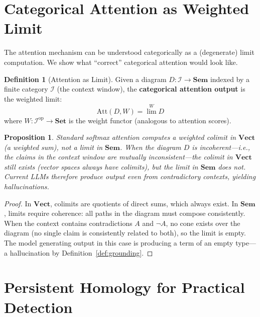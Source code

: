 \documentclass[11pt,a4paper,twocolumn]{article}
\theoremstyle{plain}
\newtheorem{proposition}[theorem]{Proposition}
\theoremstyle{definition}
\newtheorem{definition}[theorem]{Definition}
\newcommand{\Sem}{\mathbf{Sem}}
\newcommand{\Vect}{\mathbf{Vect}}
\newcommand{\Set}{\mathbf{Set}}
\begin{document}
\section{Categorical Attention as Weighted Limit}\label{sec:attention}

The attention mechanism can be understood categorically as a (degenerate) limit computation. We show what ``correct'' categorical attention would look like.

\begin{definition}[Attention as Limit]\label{def:cattention}
Given a diagram $D\colon \mathcal{I} \to \Sem$ indexed by a finite category $\mathcal{I}$ (the context window), the \textbf{categorical attention output} is the weighted limit:
\[
  \mathrm{Att}(D, W) = \lim^W D
\]
where $W\colon \mathcal{I}^{\mathrm{op}} \to \Set$ is the weight functor (analogous to attention scores).
\end{definition}

\begin{proposition}\label{prop:att-halluc}
Standard softmax attention computes a weighted \emph{colimit} in $\Vect$ (a weighted sum), not a limit in $\Sem$. When the diagram $D$ is incoherent---i.e., the claims in the context window are mutually inconsistent---the colimit in $\Vect$ still exists (vector spaces always have colimits), but the limit in $\Sem$ does not. Current LLMs therefore produce output even from contradictory contexts, yielding hallucinations.
\end{proposition}

\begin{proof}
In $\Vect$, colimits are quotients of direct sums, which always exist. In $\Sem$, limits require coherence: all paths in the diagram must compose consistently. When the context contains contradictions $A$ and $\neg A$, no cone exists over the diagram (no single claim is consistently related to both), so the limit is empty. The model generating output in this case is producing a term of an empty type---a hallucination by Definition~\ref{def:grounding}.
\end{proof}

\section{Persistent Homology for Practical Detection}\label{sec:persistent}
\end{document}
